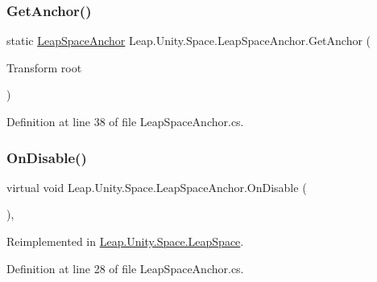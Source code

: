 \subsubsection{\texorpdfstring{GetAnchor()}{GetAnchor()}}
{\footnotesize\ttfamily static \mbox{\hyperlink{class_leap_1_1_unity_1_1_space_1_1_leap_space_anchor}{Leap\+Space\+Anchor}} Leap.\+Unity.\+Space.\+Leap\+Space\+Anchor.\+Get\+Anchor (\begin{DoxyParamCaption}\item[{Transform}]{root }\end{DoxyParamCaption})\hspace{0.3cm}{\ttfamily [static]}}



Definition at line 38 of file Leap\+Space\+Anchor.\+cs.

\mbox{\label{class_leap_1_1_unity_1_1_space_1_1_leap_space_anchor_a32bd2bf4b3fd30ee608f1e6b2d07af88}} 
\subsubsection{\texorpdfstring{OnDisable()}{OnDisable()}}
{\footnotesize\ttfamily virtual void Leap.\+Unity.\+Space.\+Leap\+Space\+Anchor.\+On\+Disable (\begin{DoxyParamCaption}{ }\end{DoxyParamCaption})\hspace{0.3cm}{\ttfamily [protected]}, {\ttfamily [virtual]}}



Reimplemented in \mbox{\hyperlink{class_leap_1_1_unity_1_1_space_1_1_leap_space_abc3c50579682cc467e55f2f857f18321}{Leap.\+Unity.\+Space.\+Leap\+Space}}.



Definition at line 28 of file Leap\+Space\+Anchor.\+cs.

\mbox{\label{class_leap_1_1_unity_1_1_space_1_1_leap_space_anchor_abc81e1e200c6c14e6dab295309b7c854}} 
